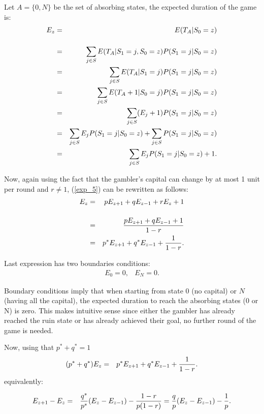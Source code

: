 \documentclass[11pt,twoside]{article}
\numberwithin{Theorem}{section}
\numberwithin{Definition}{section}
\numberwithin{Lemma}{section}
\numberwithin{Algorithm}{section}
\numberwithin{equation}{section}
\begin{document}
Let $A = \{0,N\}$ be the set of absorbing states, the expected duration of the game is:
\begin{eqnarray}
E_{z} &= &E(T_{A} \text{\textbar} S_{0}= z) \notag\\[12pt]
&= & \sum_{j\in S}E(T_{A} \text{\textbar} S_{1} = j, S_{0}= z) P(S_{1}= j \text{\textbar} S_{0}= z)\notag\\
&=& \sum_{j\in S}E(T_{A} \text{\textbar} S_{1} = j) P(S_{1}= j \text{\textbar} S_{0}= z)\notag\\
&=& \sum_{j\in S}E(T_{A} + 1\text{\textbar} S_{0} = j) P(S_{1}= j \text{\textbar} S_{0}= z)\notag\\
&=& \sum_{j\in S}(E_{j} + 1 )P(S_{1}= j \text{\textbar} S_{0}= z)\notag\\
&=& \sum_{j\in S}E_{j}P(S_{1}= j \text{\textbar} S_{0}= z) + \sum_{j\in S}P(S_{1}= j \text{\textbar} S_{0}= z)\notag\\
&=& \sum_{j\in S}E_{j}P(S_{1}= j \text{\textbar} S_{0}= z) + 1.\label{exp_5} 
\end{eqnarray}

Now, again using the fact that the gambler's capital can change by at most 1 unit per round and $r \neq 1$, (\ref{exp_5}) can be rewritten as follows:
\begin{eqnarray}
E_{z} &=&  p  E_{z+1}+ q E_{z-1} +  rE_{z} + 1\notag\\[12pt]
&=&  \frac{p  E_{z+1}+ q E_{z-1} + 1}{1-r} \notag\\
&=& p^{*}  E_{z+1}+ q^{*} E_{z-1} +  \frac{1}{1-r}. \label{exp_6} 
\end{eqnarray}

Last expression has two boundaries conditions:
\begin{eqnarray}
E_{0} = 0, & E_{N} = 0.
\label{exp_7} 
\end{eqnarray}

Boundary conditions imply that when starting from state $0$ (no capital) or $N$ (having all the capital), the expected duration to reach the absorbing states (0 or N) is zero. This makes intuitive sense since either the gambler has already reached the ruin state or has already achieved their goal, no further round of the game is needed.

Now, using that $p^{*} + q^{*} = 1$
\begin{eqnarray}
(p^{*} + q^{*})E_{z} &=&  p^{*}  E_{z+1}+ q^{*} E_{z-1} + \frac{1}{1-r}.\notag 
\end{eqnarray}
equivalently:

\begin{eqnarray}
E_{z+1}- E_{z} &=&  \frac{q^{*}}{p^{*}}(E_{z}- E_{z-1})-\frac{1-r}{p (1-r)}  = \frac{q}{p}(E_{z}- E_{z-1}) - \frac{1}{p}.  \notag
\end{eqnarray}
\end{document}
